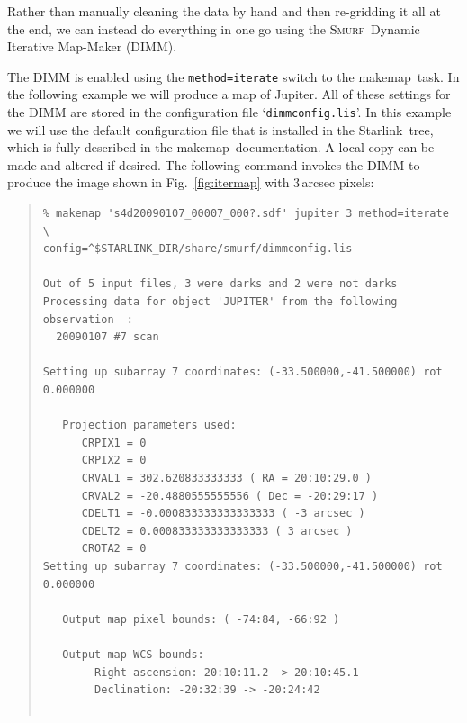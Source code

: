 \documentclass[twoside,11pt]{article}
\newenvironment{myquote}{\begin{quote}\begin{small}}{\end{small}\end{quote}}
\newcommand{\starlink}{\htmladdnormallink{Starlink}{http://starlink.jach.hawaii.edu}}
\newcommand{\smurf}{\xref{\textsc{Smurf}}{sun258}{}}
\newcommand{\task}[1]{\textsf{#1}}
\newcommand{\makemap}{\xref{\task{makemap}}{sun258}{MAKEMAP}}
\newcommand{\htmladdnormallink}[2]{#1}
\newcommand{\xref}[3]{#1}
\renewcommand{\_}{\texttt{\symbol{95}}}
\begin{document}
Rather than manually cleaning the data by hand and then re-gridding it
all at the end, we can instead do everything in one go using the
\smurf\ Dynamic Iterative Map-Maker (DIMM).

The DIMM is enabled using the \texttt{method=iterate} switch to the
\makemap\ task. In the following example we will produce a map of
Jupiter. All of these settings for the DIMM are stored in the
configuration file `\texttt{dimmconfig.lis}'. In this example we will
use the default configuration file that is installed in the \starlink\
tree, which is fully described in the \makemap\ documentation. A local
copy can be made and altered if desired. The following command invokes
the DIMM to produce the image shown in Fig.~\ref{fig:itermap} with
3\,arcsec pixels:

\begin{myquote}
\begin{verbatim}
% makemap 's4d20090107_00007_000?.sdf' jupiter 3 method=iterate \
config=^$STARLINK_DIR/share/smurf/dimmconfig.lis

Out of 5 input files, 3 were darks and 2 were not darks
Processing data for object 'JUPITER' from the following observation  :
  20090107 #7 scan

Setting up subarray 7 coordinates: (-33.500000,-41.500000) rot 0.000000

   Projection parameters used:
      CRPIX1 = 0
      CRPIX2 = 0
      CRVAL1 = 302.620833333333 ( RA = 20:10:29.0 )
      CRVAL2 = -20.4880555555556 ( Dec = -20:29:17 )
      CDELT1 = -0.000833333333333333 ( -3 arcsec )
      CDELT2 = 0.000833333333333333 ( 3 arcsec )
      CROTA2 = 0
Setting up subarray 7 coordinates: (-33.500000,-41.500000) rot 0.000000

   Output map pixel bounds: ( -74:84, -66:92 )

   Output map WCS bounds:
        Right ascension: 20:10:11.2 -> 20:10:45.1
        Declination: -20:32:39 -> -20:24:42


\end{verbatim}
\end{myquote}
\end{document}
